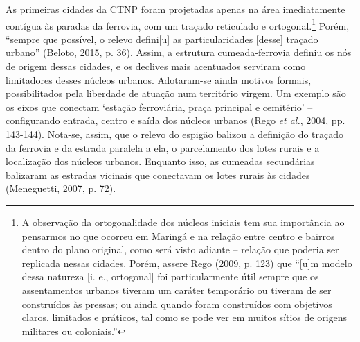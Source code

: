 \documentclass[12pt, a4paper]{book} %
\begin{document}
        As primeiras cidades da CTNP foram projetadas apenas na área imediatamente contígua às paradas da ferrovia, com um traçado reticulado e ortogonal.\footnote[16]{A observação da ortogonalidade dos núcleos iniciais tem sua importância ao pensarmos no que ocorreu em Maringá e na relação entre centro e bairros dentro do plano original, como será visto adiante – relação que poderia ser replicada nessas cidades. Porém, assere Rego (2009, p. 123) que ``[u]m modelo dessa natureza [i. e., ortogonal] foi particularmente útil sempre que os assentamentos urbanos tiveram um caráter temporário ou tiveram de ser construídos às pressas; ou ainda quando foram construídos com objetivos claros, limitados e práticos, tal como se pode ver em muitos sítios de origens militares ou coloniais.''} Porém, ``sempre que possível, o relevo defini[u] as particularidades [desse] traçado urbano'' (Beloto, 2015, p. 36). Assim, a estrutura cumeada-ferrovia definiu os nós de origem dessas cidades, e os declives mais acentuados serviram como limitadores desses núcleos urbanos. Adotaram-se ainda motivos formais, possibilitados pela liberdade de atuação num território virgem. Um exemplo são os eixos que conectam `estação ferroviária, praça principal e cemitério' – configurando entrada, centro e saída dos núcleos urbanos (Rego \textit{et al.}, 2004, pp. 143-144). Nota-se, assim, que o relevo do espigão balizou a definição do traçado da ferrovia e da estrada paralela a ela, o parcelamento dos lotes rurais e a localização dos núcleos urbanos. Enquanto isso, as cumeadas secundárias balizaram as estradas vicinais que conectavam os lotes rurais às cidades (Meneguetti, 2007, p. 72).%

       
\end{document}
